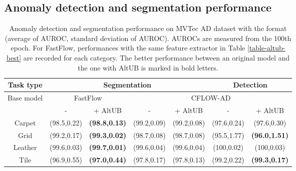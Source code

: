 \documentclass[letterpaper]{article}
\begin{document}
\subsection{Anomaly detection and segmentation performance} 
\begin{table*}[t]
\caption{Anomaly detection and segmentation performance on MVTec AD dataset with the format  (average of AUROC, standard deviation of AUROC). AUROCs are measured from the 100th epoch. For FastFlow, performances with the same feature extractor in Table \ref{table-altub-best} are recorded for each category. The better performance between an original model and the one with AltUB is marked in bold letters.}
\label{table-altub-stability}
\centering
\begin{tabular}{c|cccc|cc}
\hline
Task type  & \multicolumn{4}{c|}{Segmentation}                                                                                                                                    & \multicolumn{2}{c}{Detection}                           \\ \hline
Base model & \multicolumn{2}{c|}{FastFlow}                                                         & \multicolumn{4}{c}{CFLOW-AD}                                                                                                           \\ \hline
           & \multicolumn{1}{c}{-}                     & \multicolumn{1}{c|}{+ AltUB}               & \multicolumn{1}{c}{-}            & \multicolumn{1}{c|}{+ AltUB}               & \multicolumn{1}{c}{-}             & + AltUB               \\ \hline
Carpet     & \multicolumn{1}{c}{(98.5,0.22)}          & \multicolumn{1}{c|}{\textbf{(98.8,0.13)}} & \multicolumn{1}{c}{(99.2,0.09)} & \multicolumn{1}{c|}{(99.2,0.08)}          & \multicolumn{1}{c}{(97.6,0.24)}  & (97.6,0.30)          \\
Grid       & \multicolumn{1}{c}{(99.2,0.17)}          & \multicolumn{1}{c|}{\textbf{(99.3,0.02)}} & \multicolumn{1}{c}{(98.7,0.08)} & \multicolumn{1}{c|}{(98.7,0.08)}          & \multicolumn{1}{c}{(95.5,1.77)}  & \textbf{(96.0,1.51)} \\
Leather    & \multicolumn{1}{c}{(99.6,0.03)}          & \multicolumn{1}{c|}{\textbf{(99.7,0.01)}} & \multicolumn{1}{c}{(99.6,0.04)} & \multicolumn{1}{c|}{(99.6,0.04)}          & \multicolumn{1}{c}{(100,0.02)}   & (100,0.03)           \\
Tile       & \multicolumn{1}{c}{(96.9,0.55)}          & \multicolumn{1}{c|}{\textbf{(97.0,0.44)}} & \multicolumn{1}{c}{(97.8,0.17)} & \multicolumn{1}{c|}{(97.8,0.13)}          & \multicolumn{1}{c}{(99.2,0.22)}  & \textbf{(99.3,0.17)} \\

\end{tabular}
\end{table*}
\end{document}

